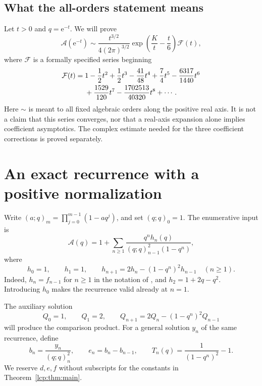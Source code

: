\documentclass[11pt]{article}
\numberwithin{equation}{section}
\theoremstyle{definition}\newtheorem{definition}[theorem]{Definition}
\theoremstyle{remark}\newtheorem{remark}[theorem]{Remark}
\newcommand{\pp}[1]{(q;q)_{#1}}
\newcommand{\Acal}{\mathcal A}
\newcommand{\ee}{\mathrm e}
\begin{document}
\subsection{What the all-orders statement means}
Let $t>0$ and $q=\ee^{-t}$. We will prove
\begin{equation}\label{lcp:eq:radialintro}
 \Acal(\ee^{-t})\sim
 \frac{t^{3/2}}{4(2\pi)^{3/2}}
 \exp\!\left(\frac Kt-\frac t6\right)\mathcal F(t),
\end{equation}
where $\mathcal F$ is a formally specified series beginning
\begin{align}\label{lcp:eq:Fintro}
 \mathcal F(t)={}&1-\frac12t^2+\frac12t^3-\frac{41}{48}t^4
       +\frac74t^5-\frac{6317}{1440}t^6\notag\\
       &+\frac{1529}{120}t^7-\frac{1702513}{40320}t^8+\cdots.
\end{align}
Here $\sim$ is meant to all fixed algebraic orders along the positive
real axis. It is not a claim that this series converges, nor that a
real-axis expansion alone implies coefficient asymptotics. The complex
estimate needed for the three coefficient corrections is proved separately.

\section{An exact recurrence with a positive normalization}
Write $(a;q)_m=\prod_{j=0}^{m-1}(1-aq^j)$, and set $\pp0=1$.
The enumerative input is
\begin{equation}\label{lcp:eq:enum}
 \Acal(q)=1+\sum_{n\ge1}
 \frac{q^n h_n(q)}{\pp{n-1}^2(1-q^n)},
\end{equation}
where
\begin{equation}\label{lcp:eq:hrec}
 h_0=1,\qquad h_1=1,\qquad
 h_{n+1}=2h_n-(1-q^n)^2h_{n-1}\quad(n\ge1).
\end{equation}
Indeed, $h_n=f_{n-1}$ for $n\ge1$ in the notation of \cite{gk}, and
$h_2=1+2q-q^2$. Introducing $h_0$ makes the recurrence valid already
at $n=1$.

The auxiliary solution
\begin{equation}\label{lcp:eq:Qrec}
 Q_0=1,\qquad Q_1=2,\qquad
 Q_{n+1}=2Q_n-(1-q^n)^2Q_{n-1}
\end{equation}
will produce the comparison product. For a general solution $y_n$ of the
same recurrence, define
\[
 b_n=\frac{y_n}{\pp n^2},\qquad e_n=b_n-b_{n-1},\qquad
 T_n(q)=\frac1{(1-q^n)^2}-1.
\]
We reserve $d,e,f$ without subscripts for the constants in
Theorem~\ref{lcp:thm:main}.
\end{document}
